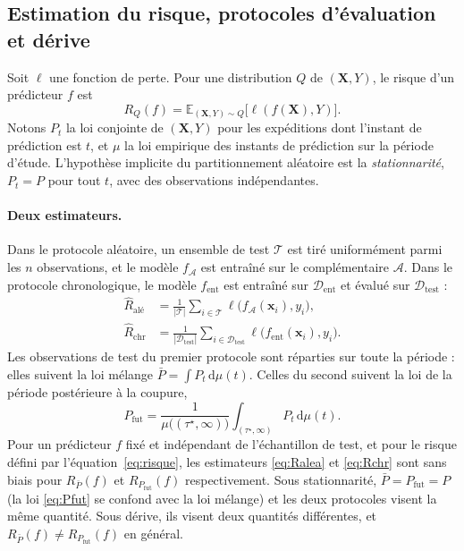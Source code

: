 \documentclass[11pt,a4paper]{article}
\newcommand{\E}{\mathbb{E}}
\theoremstyle{definition}
\begin{document}
\subsection{Estimation du risque, protocoles d'évaluation et dérive}
\label{sec:protocoles}

Soit $\ell$ une fonction de perte. Pour une distribution $Q$ de $(\mathbf{X}, Y)$, le risque d'un prédicteur $f$ est
\begin{equation}
  R_Q(f) = \E_{(\mathbf{X},Y)\sim Q}\bigl[\ell(f(\mathbf{X}), Y)\bigr].
  \label{eq:risque}
\end{equation}
Notons $P_t$ la loi conjointe de $(\mathbf{X},Y)$ pour les expéditions dont l'instant de prédiction est $t$, et $\mu$ la loi empirique des instants de prédiction sur la période d'étude. L'hypothèse implicite du partitionnement aléatoire est la \emph{stationnarité}, $P_t = P$ pour tout $t$, avec des observations indépendantes.

\paragraph{Deux estimateurs.} Dans le protocole aléatoire, un ensemble de test $\mathcal{T}$ est tiré uniformément parmi les $n$ observations, et le modèle $f_{\mathcal{A}}$ est entraîné sur le complémentaire $\mathcal{A}$. Dans le protocole chronologique, le modèle $f_{\mathrm{ent}}$ est entraîné sur $\mathcal{D}_{\mathrm{ent}}$ et évalué sur $\mathcal{D}_{\mathrm{test}}$ :
\begin{align}
  \widehat{R}_{\text{alé}} &= \frac{1}{|\mathcal{T}|} \sum_{i\in\mathcal{T}} \ell\bigl(f_{\mathcal{A}}(\mathbf{x}_i), y_i\bigr), \label{eq:Ralea}\\
  \widehat{R}_{\mathrm{chr}} &= \frac{1}{|\mathcal{D}_{\mathrm{test}}|} \sum_{i\in\mathcal{D}_{\mathrm{test}}} \ell\bigl(f_{\mathrm{ent}}(\mathbf{x}_i), y_i\bigr). \label{eq:Rchr}
\end{align}
Les observations de test du premier protocole sont réparties sur toute la période : elles suivent la loi mélange $\bar{P} = \int P_t \,\mathrm{d}\mu(t)$. Celles du second suivent la loi de la période postérieure à la coupure,
\begin{equation}
  P_{\mathrm{fut}} = \frac{1}{\mu\bigl((\tau^\star,\infty)\bigr)} \int_{(\tau^\star,\infty)} P_t \,\mathrm{d}\mu(t).
  \label{eq:Pfut}
\end{equation}
Pour un prédicteur $f$ fixé et indépendant de l'échantillon de test, et pour le risque défini par l'équation~\eqref{eq:risque}, les estimateurs \eqref{eq:Ralea} et \eqref{eq:Rchr} sont sans biais pour $R_{\bar{P}}(f)$ et $R_{P_{\mathrm{fut}}}(f)$ respectivement. Sous stationnarité, $\bar{P} = P_{\mathrm{fut}} = P$ (la loi \eqref{eq:Pfut} se confond avec la loi mélange) et les deux protocoles visent la même quantité. Sous dérive, ils visent deux quantités différentes, et $R_{\bar{P}}(f) \neq R_{P_{\mathrm{fut}}}(f)$ en général.
\end{document}
